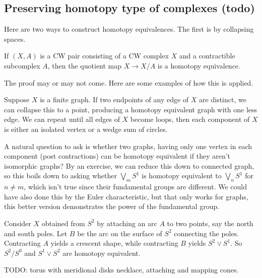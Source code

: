 \subsection{Preserving homotopy type of complexes (todo)}
Here are two ways to construct homotopy equivalences. The first is by collapsing spaces. 
\begin{prop}
    If $(X,A)$ is a CW pair consisting of a CW complex $X$ and a contractible subcomplex $A$, then the quotient map $X\to X /A$ is a homotopy equivalence.
\end{prop}
The proof may or may not come. Here are some examples of how this is applied.
\begin{example}[Graphs]
    Suppose $X$ is a finite graph. If two endpoints of any edge of $X$ are distinct, we can collapse this to a point, producing a homotopy equivalent graph with one less edge. We can repeat until all edges of $X$ become loops, then each component of $X$ is either an isolated vertex or a wedge sum of circles. 

    A natural question to ask is whether two graphs, having only one vertex in each component (post contractions) can be homotopy equivalent if they aren't isomorphic graphs? By an exercise, we can reduce this down to connected graph, so this boils down to asking whether $\bigvee_m S^1 $ is homotopy equivalent to $\bigvee_n S^1 $ for $n\neq m$, which isn't true since their fundamental groups are different. We could have also done this by the Euler characteristic, but that only works for graphs, this better version demonstrates the power of the fundamental group.
\end{example}
\begin{example}
    Consider $X$ obtained from $S^2$ by attaching an arc $A$ to two points, say the north and south poles. Let $B$ be the arc on the surface of $S^2$ connecting the poles. Contracting $A$ yields a crescent shape, while contracting $B$ yields $S^2\vee S^1 $. So $S^2 /S^0$ and $S^1 \vee S^2$ are homotopy equivalent.
\end{example}
TODO: torus with meridional disks necklace, attaching and mapping cones.


